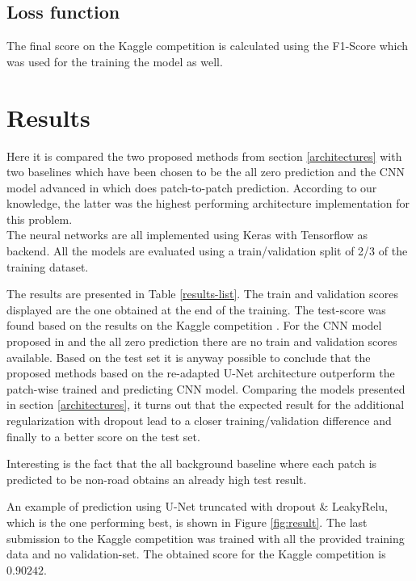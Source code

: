 \documentclass[10pt,conference,compsocconf]{IEEEtran}
\begin{document}
\subsection{Loss function}

The final score on the Kaggle competition \cite{KaggleCompetition} is calculated using the F1-Score which was used for the training the model as well.

\section{Results}

Here it is compared the two proposed methods from section \ref{architectures} with two baselines which have been chosen to be the all zero prediction and the CNN model advanced in \cite{Pavllo2017} which does patch-to-patch prediction. According to our knowledge, the latter was the highest performing architecture implementation for this problem. \\
The neural networks are all implemented using Keras with Tensorflow as backend. All the models are evaluated using a train/validation split of 2/3 of the training dataset.

The results are presented in Table \ref{results-list}. The train and validation scores displayed are the one obtained at the end of the training. The test-score was found based on the results on the Kaggle competition \cite{KaggleCompetition}. For the CNN model proposed in \cite{Pavllo2017} and the all zero prediction there are no train and validation scores available. Based on the test set it is anyway possible to conclude that the proposed methods based on the re-adapted U-Net architecture outperform the patch-wise trained and predicting CNN model. Comparing the models presented in section \ref{architectures}, it turns out that the expected result for the additional regularization with dropout lead to a closer training/validation difference and finally to a better score on the test set.

Interesting is the fact that the all background baseline where each patch is predicted to be non-road obtains an already high test result.

An example of prediction using U-Net truncated with dropout \& LeakyRelu, which is the one performing best, is shown in Figure \ref{fig:result}. The last submission to the Kaggle competition was trained with all the provided training data and no validation-set. The obtained score for the Kaggle competition is $0.90242$.
\end{document}

